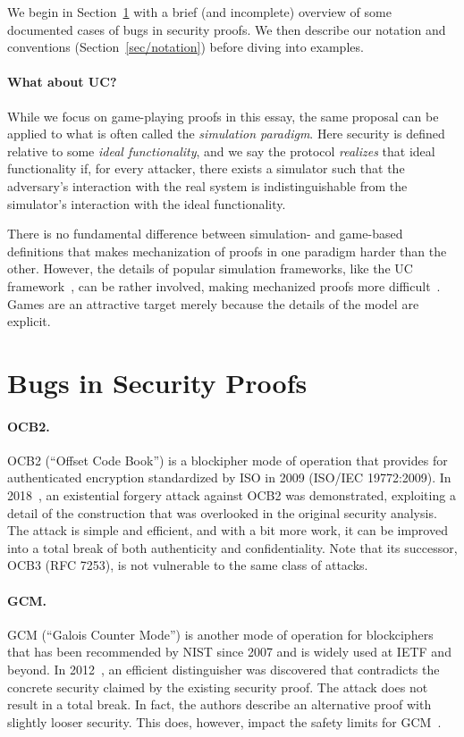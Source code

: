 \documentclass{article}
\begin{document}
We begin in Section~\ref{sec/bugs} with a brief (and incomplete) overview of
some documented cases of bugs in security proofs.
%
We then describe our notation and conventions (Section~\ref{sec/notation})
before diving into examples.

\paragraph{What about UC?}
%
While we focus on game-playing proofs in this essay, the same proposal can be
applied to what is often called the \emph{simulation paradigm}. Here security
is defined relative to some \emph{ideal functionality}, and we say the protocol
\emph{realizes} that ideal functionality if, for every attacker, there exists a
simulator such that the adversary's interaction with the real system is
indistinguishable from the simulator's interaction with the ideal
functionality.

There is no fundamental difference between simulation- and game-based
definitions that makes mechanization of proofs in one paradigm harder than the
other.
%
However, the details of popular simulation frameworks, like the UC
framework~\cite{Can01}, can be rather involved, making mechanized proofs more
difficult~\cite{CSV19}.
%
Games are an attractive target merely because the details of the model are
explicit.

\section{Bugs in Security Proofs}\label{sec/bugs}

\paragraph{OCB2.}
%
OCB2 (``Offset Code Book'') is a blockipher mode of operation that provides for
authenticated encryption standardized by ISO in 2009 (ISO/IEC 19772:2009). In
2018~\cite{IIMP19}, an existential forgery attack against OCB2 was
demonstrated, exploiting a detail of the construction that was overlooked in
the original security analysis.
%
The attack is simple and efficient, and with a bit more work, it can be
improved into a total break of both authenticity and confidentiality.
%
Note that its successor, OCB3 (RFC 7253), is not vulnerable to the same class
of attacks.

\paragraph{GCM.}
%
GCM (``Galois Counter Mode'') is another mode of operation for blockciphers
that has been recommended by NIST since 2007 and is widely used at IETF and
beyond.
%
In 2012~\cite{IOM12}, an efficient distinguisher was discovered that
contradicts the concrete security claimed by the existing security proof.
%
The attack does not result in a total break. In fact, the authors describe an
alternative proof with slightly looser security.
%
This does, however, impact the safety limits for GCM~\cite{irtf-cfrg-aead-limits-08}.
\end{document}
